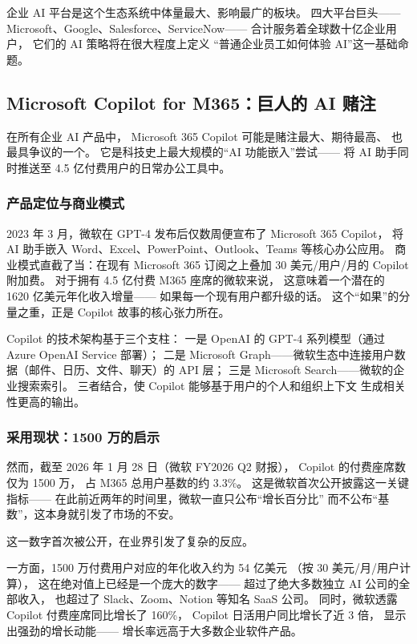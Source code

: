 企业 AI 平台是这个生态系统中体量最大、影响最广的板块。
四大平台巨头——Microsoft、Google、Salesforce、ServiceNow——
合计服务着全球数十亿企业用户，
它们的 AI 策略将在很大程度上定义
``普通企业员工如何体验 AI''这一基础命题。

\subsection{Microsoft Copilot for M365：巨人的 AI 赌注}

在所有企业 AI 产品中，
Microsoft 365 Copilot 可能是赌注最大、期待最高、
也最具争议的一个。
它是科技史上最大规模的``AI 功能嵌入''尝试——
将 AI 助手同时推送至 4.5 亿付费用户的日常办公工具中。

\subsubsection{产品定位与商业模式}
2023 年 3 月，微软在 GPT-4 发布后仅数周便宣布了 Microsoft 365 Copilot，
将 AI 助手嵌入 Word、Excel、PowerPoint、Outlook、Teams 等核心办公应用。
商业模式直截了当：在现有 Microsoft 365 订阅之上叠加 30 美元/用户/月的 Copilot 附加费。
对于拥有 4.5 亿付费 M365 座席的微软来说，
这意味着一个潜在的 1620 亿美元年化收入增量——
如果每一个现有用户都升级的话。
这个``如果''的分量之重，正是 Copilot 故事的核心张力所在。

Copilot 的技术架构基于三个支柱：
一是 OpenAI 的 GPT-4 系列模型（通过 Azure OpenAI Service 部署）；
二是 Microsoft Graph——微软生态中连接用户数据（邮件、日历、文件、聊天）的 API 层；
三是 Microsoft Search——微软的企业搜索索引。
三者结合，使 Copilot 能够基于用户的个人和组织上下文
生成相关性更高的输出。

\subsubsection{采用现状：1500 万的启示}
然而，截至 2026 年 1 月 28 日（微软 FY2026 Q2 财报），
Copilot 的付费座席数仅为 1500 万，
占 M365 总用户基数的约 3.3\%。
这是微软首次公开披露这一关键指标——
在此前近两年的时间里，微软一直只公布``增长百分比''
而不公布``基数''，这本身就引发了市场的不安。

这一数字首次被公开，在业界引发了复杂的反应。

一方面，1500 万付费用户对应的年化收入约为 54 亿美元
（按 30 美元/月/用户计算），
这在绝对值上已经是一个庞大的数字——
超过了绝大多数独立 AI 公司的全部收入，
也超过了 Slack、Zoom、Notion 等知名 SaaS 公司。
同时，微软透露 Copilot 付费座席同比增长了 160\%，
Copilot 日活用户同比增长了近 3 倍，
显示出强劲的增长动能——
增长率远高于大多数企业软件产品。

